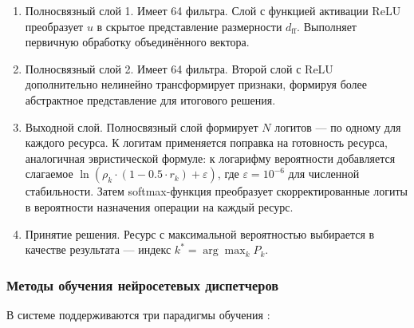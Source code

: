 \begin{enumerate}
\item Полносвязный слой 1. Имеет 64 фильтра. Слой с функцией активации ReLU преобразует $u$ в скрытое представление размерности $d_{\text{ff}}$. Выполняет первичную обработку объединённого вектора.

\item Полносвязный слой 2. Имеет 64 фильтра. Второй слой с ReLU дополнительно нелинейно трансформирует признаки, формируя более абстрактное представление для итогового решения.

\item Выходной слой. Полносвязный слой формирует $N$ логитов — по одному для каждого ресурса. К логитам применяется поправка на готовность ресурса, аналогичная эвристической формуле: к логарифму вероятности добавляется слагаемое $\ln(\rho_k \cdot (1 - 0.5 \cdot r_k) + \varepsilon)$, где $\varepsilon = 10^{-6}$ для численной стабильности. Затем softmax-функция преобразует скорректированные логиты в вероятности назначения операции на каждый ресурс.

\item Принятие решения. Ресурс с максимальной вероятностью выбирается в качестве результата — индекс $k^* = \arg\max_k P_k$.
\end{enumerate}

\subsubsection{Методы обучения нейросетевых диспетчеров}

В системе поддерживаются три парадигмы обучения \cite{sravnenieNS}:

